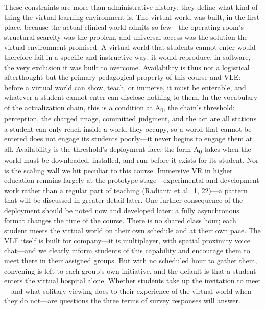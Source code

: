 These constraints are more than administrative history; they define what kind of
thing the virtual learning environment is. The virtual world was built, in the
first place, because the actual clinical world admits so few---the operating
room's structural scarcity was the problem, and universal access was the
solution the virtual environment promised. A virtual world that students cannot
enter would therefore fail in a specific and instructive way: it would
reproduce, in software, the very exclusion it was built to overcome.
Availability is thus not a logistical afterthought but the primary pedagogical
property of this course and VLE: before a virtual world can show, teach, or
immerse, it must be enterable, and whatever a student cannot enter can disclose
nothing to them. In the vocabulary of the actualization chain, this is a
condition at A\textsubscript{0}, the chain's threshold: perception, the charged
image, committed judgment, and the act are all stations a student can only
reach inside a world they occupy, so a world that cannot be entered does not
engage its students poorly---it never begins to engage them at all.
Availability is the threshold's deployment face: the form A\textsubscript{0}
takes when the world must be downloaded, installed, and run before it exists
for its student. Nor is the scaling wall we hit peculiar to this course.
Immersive VR in higher education remains largely at the prototype
stage---experimental and development work rather than a regular part of teaching
(Radianti et al.\ 1, 22)---a pattern that will be discussed in greater detail
later. One further consequence of the deployment should be noted now and
developed later: a fully asynchronous format changes the time of the course.
There is no shared class hour; each student meets the virtual world on their own
schedule and at their own pace. The VLE itself is built for company---it is
multiplayer, with spatial proximity voice chat---and we clearly inform students
of this capability and encourage them to meet there in their assigned groups.
But with no scheduled hour to gather them, convening is left to each group's own
initiative, and the default is that a student enters the virtual hospital alone.
Whether students take up the invitation to meet---and what solitary viewing does
to their experience of the virtual world when they do not---are questions the
three terms of survey responses will answer.


